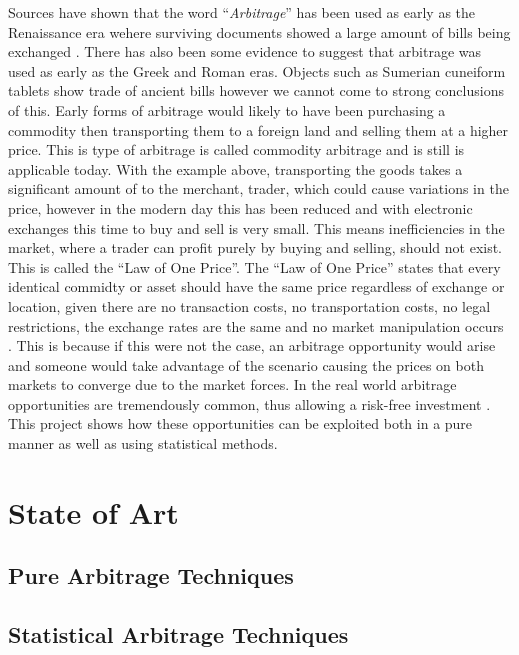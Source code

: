 Sources have shown that the word ``\textit{Arbitrage}'' has been used as early as the Renaissance era wehere surviving documents showed a large amount of bills being exchanged \cite{poitras_2021}. There has also been some evidence to suggest that arbitrage was used as early as the Greek and Roman eras. Objects such as Sumerian cuneiform tablets show trade of ancient bills however we cannot come to strong conclusions of this. Early forms of arbitrage would likely to have been purchasing a commodity then transporting them to a foreign land and selling them at a higher price. This is type of arbitrage is called commodity arbitrage and is still is applicable today. With the example above, transporting the goods takes a significant amount of to the merchant, trader, which could cause variations in the price, however in the modern day this has been reduced and with electronic exchanges this time to buy and sell is very small. This means inefficiencies in the market, where a trader can profit purely by buying and selling, should not exist. This is called the ``Law of One Price''. The ``Law of One Price'' states that every identical commidty or asset should have the same price regardless of exchange or location, given there are no transaction costs, no transportation costs, no legal restrictions, the exchange rates are the same and no market manipulation occurs \cite{noauthor_law_nodate}. This is because if this were not the case, an arbitrage opportunity would arise and someone would take advantage of the scenario causing the prices on both markets to converge due to the market forces. In the real world arbitrage opportunities are tremendously common, thus allowing a risk-free investment \cite{10.2307/1828075, RICHARDSON1978341}. This project shows how these opportunities can be exploited both in a pure manner as well as using statistical methods.

\section{State of Art}
\subsection{Pure Arbitrage Techniques}
\subsection{Statistical Arbitrage Techniques}

